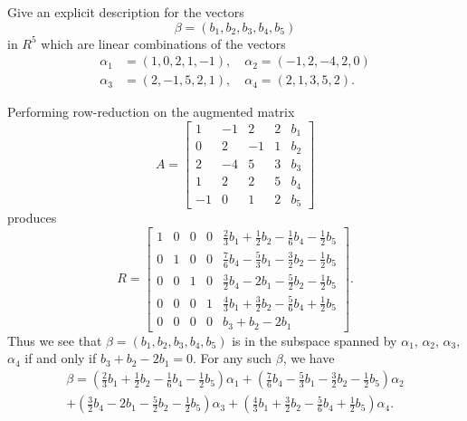  Give an explicit description for the vectors
\begin{equation*}
  \beta = (b_1, b_2, b_3, b_4, b_5)
\end{equation*}
in $R^5$ which are linear combinations of the vectors
\begin{align*}
  \alpha_1 &= (1, 0, 2, 1, -1), \quad \alpha_2 = (-1, 2, -4, 2, 0) \\
  \alpha_3 &= (2, -1, 5, 2, 1), \quad \alpha_4 = (2, 1, 3, 5, 2).
\end{align*}
\begin{solution}
  Performing row-reduction on the augmented matrix
  \begin{equation*}
    A =
    \begin{bmatrix}
      1 & -1 & 2 & 2 & b_1 \\
      0 & 2 & -1 & 1 & b_2 \\
      2 & -4 & 5 & 3 & b_3 \\
      1 & 2 & 2 & 5 & b_4 \\
      -1 & 0 & 1 & 2 & b_5
    \end{bmatrix}
  \end{equation*}
  produces
  \begin{equation*}
    R =
    \begin{bmatrix}
      1 & 0 & 0 & 0 & \frac23b_1 + \frac12b_2 - \frac16b_4 - \frac12b_5 \\[3pt]
      0 & 1 & 0 & 0 & \frac76b_4 - \frac53b_1 - \frac32b_2 - \frac12b_5 \\[3pt]
      0 & 0 & 1 & 0 & \frac32b_4 - 2b_1 - \frac52b_2 - \frac12b_5 \\[3pt]
      0 & 0 & 0 & 1 & \frac43b_1 + \frac32b_2 - \frac56b_4 + \frac12b_5 \\[3pt]
      0 & 0 & 0 & 0 & b_3 + b_2 - 2b_1
    \end{bmatrix}.
  \end{equation*}
  Thus we see that $\beta = (b_1,b_2,b_3,b_4,b_5)$ is in the subspace
  spanned by $\alpha_1$, $\alpha_2$, $\alpha_3$, $\alpha_4$ if and
  only if $b_3 + b_2 - 2b_1 = 0$. For any such $\beta$, we have
  \begin{multline*}
    \beta
    = \left(\frac23b_1 + \frac12b_2 - \frac16b_4 - \frac12b_5\right)\alpha_1
    + \left(\frac76b_4 - \frac53b_1 - \frac32b_2 - \frac12b_5\right)\alpha_2 \\
    + \left(\frac32b_4 - 2b_1 - \frac52b_2 - \frac12b_5\right)\alpha_3
    + \left(\frac43b_1 + \frac32b_2 - \frac56b_4 + \frac12b_5\right)\alpha_4.
  \end{multline*}
\end{solution}
